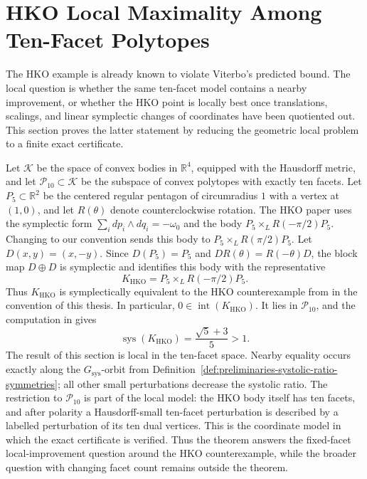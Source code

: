 \clearpage
\section[HKO Local Maximality]{HKO Local Maximality Among Ten-Facet Polytopes}
\label{sec:hko-local-maximum}

The HKO example is already known to violate Viterbo's predicted bound. The
local question is whether the same ten-facet model contains a nearby
improvement, or whether the HKO point is locally best once translations,
scalings, and linear symplectic changes of coordinates have been quotiented
out. This section proves the latter statement by reducing the geometric local
problem to a finite exact certificate.

Let \(\mathcal K\) be the space of convex bodies in \(\mathbb R^4\), equipped
with the Hausdorff metric, and let \(\mathcal P_{10}\subset\mathcal K\) be the
subspace of convex polytopes with exactly ten facets. Let
\(P_5\subset\mathbb R^2\) be the centered regular pentagon of circumradius
\(1\) with a vertex at
\((1,0)\), and let \(R(\theta)\) denote counterclockwise rotation. The HKO
paper uses the symplectic form \(\sum_i dp_i\wedge dq_i=-\omega_0\) and the
body \(P_5\times_L R(-\pi/2)P_5\).  Changing to our convention sends this
body to \(P_5\times_L R(\pi/2)P_5\).  Let \(D(x,y)=(x,-y)\).  Since
\(D(P_5)=P_5\) and \(D R(\theta)=R(-\theta)D\), the block map
\(D\oplus D\) is symplectic and identifies this body with the representative
\[
  K_{\mathrm{HKO}}=P_5\times_L R(-\pi/2)P_5.
\]
Thus \(K_{\mathrm{HKO}}\) is symplectically equivalent to the HKO
counterexample from \cite[Proposition~1.4]{HaimKislevOstrover2024} in the
convention of this thesis.
In particular, \(0\in\operatorname{int}(K_{\mathrm{HKO}})\). It lies in
\(\mathcal P_{10}\), and the computation in
\cite[Proof of Theorem~1.3]{HaimKislevOstrover2024} gives
\[
  \operatorname{sys}(K_{\mathrm{HKO}})
  =
  \frac{\sqrt{5}+3}{5}
  >1.
\]
The result of this section is local in the ten-facet space. Nearby equality
occurs exactly along the \(G_{\operatorname{sys}}\)-orbit from
Definition~\ref{def:preliminaries-systolic-ratio-symmetries}; all other small
perturbations decrease the systolic ratio.
The restriction to \(\mathcal P_{10}\) is part of the local model: the HKO body
itself has ten facets, and after polarity a Hausdorff-small ten-facet
perturbation is described by a labelled perturbation of its ten dual vertices.
This is the coordinate model in which the exact certificate is verified. Thus
the theorem answers the fixed-facet local-improvement question around the HKO
counterexample, while the broader question with changing facet count remains
outside the theorem.

